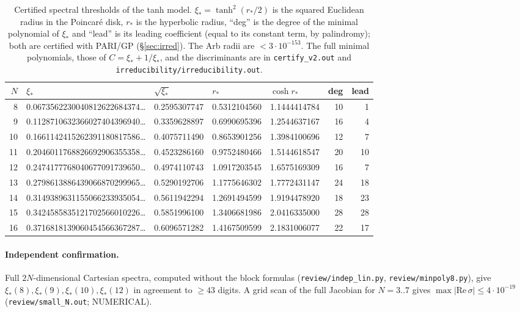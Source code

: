 \documentclass[11pt]{article}
\theoremstyle{remark}
\begin{document}
\begin{table}[ht]\centering
\begin{tabular}{rllllrr}\toprule
$N$ & $\xi_*$ & $\sqrt{\xi_*}$ & $r_*$ & $\cosh r_*$ & deg & lead\\\midrule
8 & 0.0673562230040812622684374\ldots & 0.2595307747 & 0.5312104560 & 1.1444414784 & 10 & 1\\
9 & 0.1128710632366027404396940\ldots & 0.3359628897 & 0.6990695396 & 1.2544637167 & 16 & 4\\
10 & 0.1661142415262391180817586\ldots & 0.4075711490 & 0.8653901256 & 1.3984100696 & 12 & 7\\
11 & 0.2046011768826692906355358\ldots & 0.4523286160 & 0.9752480466 & 1.5144618547 & 20 & 10\\
12 & 0.2474177768040677091739650\ldots & 0.4974110743 & 1.0917203545 & 1.6575169309 & 16 & 7\\
13 & 0.2798613886439066870299965\ldots & 0.5290192706 & 1.1775646302 & 1.7772431147 & 24 & 18\\
14 & 0.3149389631155066233935054\ldots & 0.5611942294 & 1.2691494599 & 1.9194478920 & 18 & 23\\
15 & 0.3424585835121702566010226\ldots & 0.5851996100 & 1.3406681986 & 2.0416335000 & 28 & 28\\
16 & 0.3716818139060454566367287\ldots & 0.6096571282 & 1.4167509599 & 2.1831006077 & 22 & 17\\\bottomrule
\end{tabular}
\caption{Certified spectral thresholds of the tanh model. $\xi_*=\tanh^2(r_*/2)$ is the squared Euclidean radius in the
Poincar\'e disk, $r_*$ is the hyperbolic radius, ``deg'' is the degree of the minimal polynomial of $\xi_*$ and ``lead''
is its leading coefficient (equal to its constant term, by palindromy); both are certified with PARI/GP
(\S\ref{sec:irred}). The Arb radii are $<3\cdot10^{-153}$. The full minimal polynomials, those of $C=\xi_*+1/\xi_*$,
and the discriminants are in \texttt{certify\_v2.out} and \texttt{irreducibility/irreducibility.out}.}\label{tab:cert}
\end{table}

\paragraph{Independent confirmation.} Full $2N$-dimensional Cartesian spectra, computed without the block formulas
(\texttt{review/indep\_lin.py}, \texttt{review/minpoly8.py}), give $\xi_*(8),\xi_*(9),\xi_*(10),\xi_*(12)$ in agreement to
$\ge43$ digits. A grid scan of the full Jacobian for $N=3..7$ gives $\max|\mathrm{Re}\,\sigma|\le4\cdot10^{-19}$
(\texttt{review/small\_N.out}; NUMERICAL).
\end{document}
